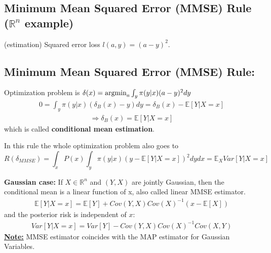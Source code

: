 \documentclass[11pt]{elegantbook}
\newcommand{\argmin}{\operatornamewithlimits{argmin}}
\begin{document}
\subsection{Minimum Mean Squared Error (MMSE) Rule ($\mathbb{R}^n$ example)}
\begin{example}
    (estimation) Squared error loss $l(a,y)=(a-y)^2$.
\end{example}
\subsection*{Minimum Mean Squared Error (MMSE) Rule:}
Optimization problem is $\delta(x)=\argmin_{a} \int_{y} \pi(y|x) (a-y)^2 dy$
\begin{equation}
    \begin{aligned}
        0=\int_{y} \pi(y|x) (\delta_B(x)-y) dy=\delta_B(x)-\mathbb{E}\left[Y|X=x\right]
    \end{aligned}
    \nonumber
\end{equation}
\begin{equation}
    \begin{aligned}
        \Rightarrow \delta_B(x)=\mathbb{E}\left[Y|X=x\right]
    \end{aligned}
    \nonumber
\end{equation}
which is called \textbf{conditional mean estimation}.

In this rule the whole optimization problem also goes to
$$R(\delta_{MMSE})=\int_x P(x)\int_y \pi(y|x) (y-\mathbb{E}\left[Y|X=x\right])^2 dy dx=\mathbb{E}_X Var\left[Y|X=x\right]$$

\textbf{Gaussian case:}
If $X\in \mathbb{R}^n$ and $(Y,X)$ are jointly Gaussian, then the conditional mean is a linear function of x, also called linear MMSE estimator.
\begin{equation}
    \begin{aligned}
        \mathbb{E}\left[Y|X=x\right]=\mathbb{E}[Y]+Cov(Y,X)Cov(X)^{-1}(x-\mathbb{E}[X])
    \end{aligned}
    \nonumber
\end{equation}
and the posterior risk is independent of $x$:
\begin{equation}
    \begin{aligned}
        Var\left[Y|X=x\right]=Var[Y]-Cov(Y,X)Cov(X)^{-1}Cov(X,Y)
    \end{aligned}
    \nonumber
\end{equation}
\underline{\textbf{Note:}} MMSE estimator coincides with the MAP estimator for Gaussian Variables.
\end{document}
